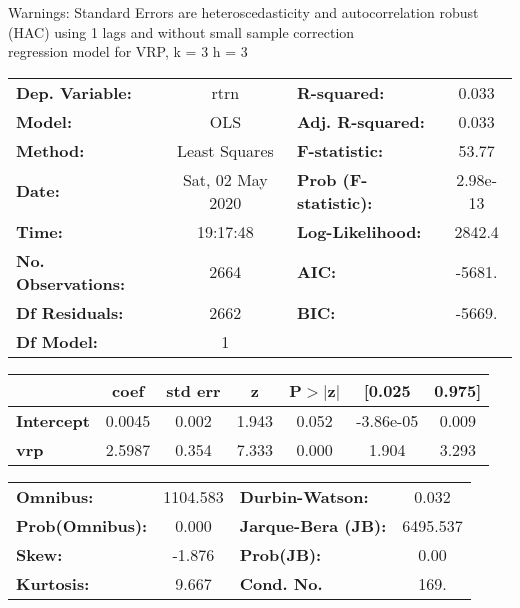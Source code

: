 Warnings: \newline
 [1] Standard Errors are heteroscedasticity and autocorrelation robust (HAC) using 1 lags and without small sample correction\\ 

regression model for VRP, k = 3 h = 3\begin{center}
\begin{tabular}{lclc}
\toprule
\textbf{Dep. Variable:}    &       rtrn       & \textbf{  R-squared:         } &     0.033   \\
\textbf{Model:}            &       OLS        & \textbf{  Adj. R-squared:    } &     0.033   \\
\textbf{Method:}           &  Least Squares   & \textbf{  F-statistic:       } &     53.77   \\
\textbf{Date:}             & Sat, 02 May 2020 & \textbf{  Prob (F-statistic):} &  2.98e-13   \\
\textbf{Time:}             &     19:17:48     & \textbf{  Log-Likelihood:    } &    2842.4   \\
\textbf{No. Observations:} &        2664      & \textbf{  AIC:               } &    -5681.   \\
\textbf{Df Residuals:}     &        2662      & \textbf{  BIC:               } &    -5669.   \\
\textbf{Df Model:}         &           1      & \textbf{                     } &             \\
\bottomrule
\end{tabular}
\begin{tabular}{lcccccc}
                   & \textbf{coef} & \textbf{std err} & \textbf{z} & \textbf{P$> |$z$|$} & \textbf{[0.025} & \textbf{0.975]}  \\
\midrule
\textbf{Intercept} &       0.0045  &        0.002     &     1.943  &         0.052        &    -3.86e-05    &        0.009     \\
\textbf{vrp}       &       2.5987  &        0.354     &     7.333  &         0.000        &        1.904    &        3.293     \\
\bottomrule
\end{tabular}
\begin{tabular}{lclc}
\textbf{Omnibus:}       & 1104.583 & \textbf{  Durbin-Watson:     } &    0.032  \\
\textbf{Prob(Omnibus):} &   0.000  & \textbf{  Jarque-Bera (JB):  } & 6495.537  \\
\textbf{Skew:}          &  -1.876  & \textbf{  Prob(JB):          } &     0.00  \\
\textbf{Kurtosis:}      &   9.667  & \textbf{  Cond. No.          } &     169.  \\
\bottomrule
\end{tabular}
\end{center}

